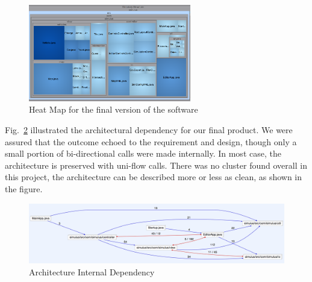 \begin{figure}[h]
\begin{minipage}{\textwidth}
	\begin{center}
			\includegraphics[width=71mm,keepaspectratio ]{img/heatmap.png}
		\caption{Heat Map for the final version of the software}
		\label{fig:heatmap}
	\end{center}
	\end{minipage}
\end{figure}

Fig.~\ref{fig:archIntDependency} illustrated the architectural dependency for our final product. We were assured that the outcome echoed to the requirement and design, though only a small portion of bi-directional calls were made internally. In most case, the architecture is preserved with uni-flow calls. There was no cluster found overall in this project, the architecture can be described more or less as clean, as shown in the figure. 

\begin{figure}[h]
	\begin{center}
			\includegraphics[width=\textwidth]{img/archIntDependency.png}
		\caption{Architecture Internal Dependency}
		\label{fig:archIntDependency}
	\end{center}
\end{figure}




